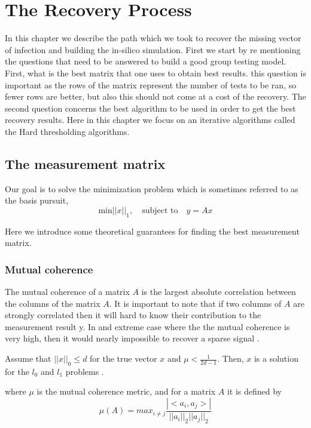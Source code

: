 \chapter{The Recovery Process}  
%
In this chapter we describe the path which we took to recover the missing vector of infection and  building the in-silico simulation. First we start by re mentioning the questions that need to be answered to build a good group testing model. First, what is the best matrix that one uses to obtain best results. this question is important as the rows of the matrix represent the number of tests to be ran, so fewer rows are better, but also this should not come at a cost of the recovery. The second question concerns the best algorithm to be used in order to get the best recovery results. Here in this chapter we focus on an iterative algorithms called the Hard thresholding algorithms. %
\section{The measurement matrix}
\label{label1}
Our goal is to solve the minimization problem which is sometimes referred to as the basis pursuit,   \begin{equation}\label{BP}
\text{min}  ||x||_1, \quad\text{subject to}\quad y = Ax 
\end{equation}   	

Here we introduce some theoretical guarantees for finding the best measurement matrix.  

\subsection{Mutual coherence}
The mutual coherence of a matrix $ A $ is the largest absolute correlation between the columns of the matrix $ A $. It is important to note that if two columns of $ A $ are strongly correlated then it will hard to know their contribution to the measurement result y. In and extreme case where the the mutual coherence is very high, then it would nearly impossible to recover  a sparse signal \cite{radar}. 
\begin{theorem}
	Assume that $ ||x||_0 \leq d $ for the true vector $ x $ and $ \mu  < \frac{1}{2d-1}$. Then, $ x $ is a solution for the $ l_0 $ and $ l_1 $ problems . 
\end{theorem} 
where $ \mu $ is the mutual coherence metric, and for a matrix $ A $ it is defined by \cite{radar}  \begin{equation}\label{key}
\mu(A) = max_{i\neq j} \frac{|<a_i,a_j>|}{||a_i||_2 ||a_j||_2}
\end{equation} 


